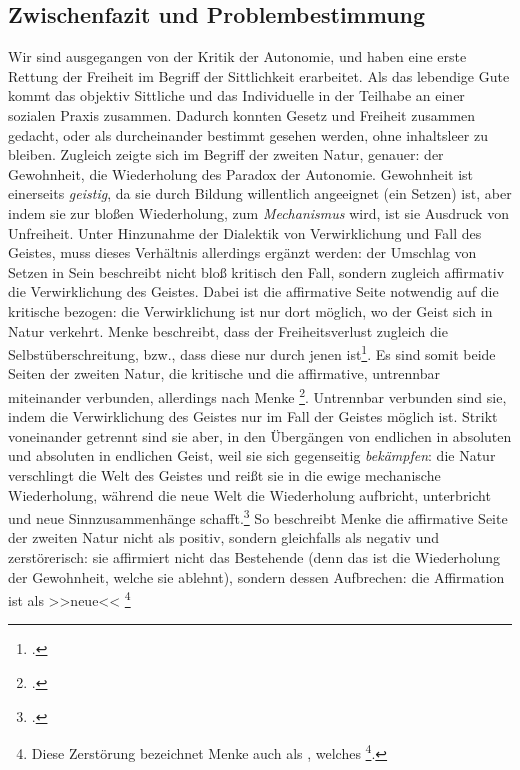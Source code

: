 \documentclass[12pt, a4paper, openany]{report}
\begin{document}
\subsection{Zwischenfazit und Problembestimmung}\label{zwisschenfazit}
Wir sind ausgegangen von der Kritik der Autonomie, und haben eine erste Rettung der Freiheit im Begriff der Sittlichkeit erarbeitet. 
Als das lebendige Gute kommt das objektiv Sittliche und das Individuelle in der Teilhabe an einer sozialen Praxis zusammen. 
Dadurch konnten Gesetz und Freiheit zusammen gedacht, oder als durcheinander bestimmt gesehen werden, ohne inhaltsleer zu bleiben.
Zugleich zeigte sich im Begriff der zweiten Natur, genauer: der Gewohnheit, die Wiederholung des Paradox der Autonomie.
Gewohnheit ist einerseits \emph{geistig}, da sie durch Bildung willentlich angeeignet (ein Setzen) ist, aber indem sie zur bloßen Wiederholung, zum \emph{Mechanismus} wird, ist sie  Ausdruck von Unfreiheit.
Unter Hinzunahme der Dialektik von Verwirklichung und Fall des Geistes, muss dieses Verhältnis allerdings ergänzt werden:
der Umschlag von Setzen in Sein beschreibt nicht bloß kritisch den Fall, sondern zugleich affirmativ die Verwirklichung des Geistes.
Dabei ist die affirmative Seite notwendig auf die kritische bezogen: 
die Verwirklichung ist nur dort möglich, wo der Geist sich in Natur verkehrt.
Menke beschreibt, dass der Freiheitsverlust zugleich die Selbstüberschreitung, bzw., dass diese nur durch jenen ist\footcite[Vgl.][145]{menke_autonomie_2018}.
Es sind somit beide Seiten der zweiten Natur, die kritische und die affirmative, untrennbar miteinander verbunden, allerdings nach Menke \footcite[][147]{menke_autonomie_2018}.
Untrennbar verbunden sind sie, indem die Verwirklichung des Geistes nur im Fall der Geistes möglich ist.
Strikt voneinander getrennt sind sie aber, in den Übergängen von endlichen in absoluten und absoluten in endlichen Geist, weil sie sich gegenseitig \emph{bekämpfen}:
die Natur verschlingt die Welt des Geistes und reißt sie in die ewige mechanische Wiederholung, während die neue Welt die Wiederholung aufbricht, unterbricht und neue Sinnzusammenhänge schafft.\footcite[Vgl.][147]{menke_autonomie_2018}
So beschreibt Menke die affirmative Seite der zweiten Natur nicht als positiv, sondern gleichfalls als negativ und zerstörerisch:
sie affirmiert nicht das Bestehende (denn das ist die Wiederholung der Gewohnheit, welche sie ablehnt), sondern dessen Aufbrechen: 
die Affirmation ist als >>neue<< %
\footnote{
    \cite[][S. 148. Hervorhebung von mir.]{menke_autonomie_2018}
    Diese Zerstörung bezeichnet Menke auch als , welches \footcite[][147]{menke_autonomie_2018}.
}%
\end{document}
